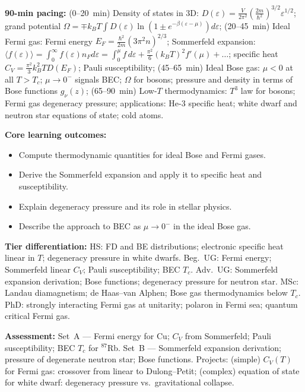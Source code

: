 \documentclass[11pt,a4paper]{article}
\begin{document}
\medskip

\begin{tcolorbox}[modulebox, title={Module~II.7 / L03: Quantum Ideal Gases}]
\textbf{90-min pacing:} (0--20~min) Density of states in 3D: $D(\varepsilon)=\tfrac{V}{2\pi^2}(\tfrac{2m}{\hbar^2})^{3/2}\varepsilon^{1/2}$; grand potential $\Omega=\mp k_BT\int D(\varepsilon)\ln(1\pm e^{-\beta(\varepsilon-\mu)})d\varepsilon$; (20--45~min) Ideal Fermi gas: Fermi energy $E_F=\tfrac{\hbar^2}{2m}(3\pi^2n)^{2/3}$; Sommerfeld expansion: $\langle f(\varepsilon)\rangle=\int_0^\infty f(\varepsilon)n_F d\varepsilon=\int_0^\mu f\,d\varepsilon+\tfrac{\pi^2}{6}(k_BT)^2f'(\mu)+\ldots$; specific heat $C_V=\tfrac{\pi^2}{3}k_B^2TD(E_F)$; Pauli susceptibility; (45--65~min) Ideal Bose gas: $\mu<0$ at all $T>T_c$; $\mu\to 0^-$ signals BEC; $\Omega$ for bosons; pressure and density in terms of Bose functions $g_\nu(z)$; (65--90~min) Low-$T$ thermodynamics: $T^3$ law for bosons; Fermi gas degeneracy pressure; applications: He-3 specific heat; white dwarf and neutron star equations of state; cold atoms.

\medskip\textbf{Core learning outcomes:}
\begin{itemize}[leftmargin=1.4em,topsep=2pt,itemsep=1pt]
  \item Compute thermodynamic quantities for ideal Bose and Fermi gases.
  \item Derive the Sommerfeld expansion and apply it to specific heat and susceptibility.
  \item Explain degeneracy pressure and its role in stellar physics.
  \item Describe the approach to BEC as $\mu\to 0^-$ in the ideal Bose gas.
\end{itemize}

\medskip\textbf{Tier differentiation:}
HS: FD and BE distributions; electronic specific heat linear in $T$; degeneracy pressure in white dwarfs.
Beg.\ UG: Fermi energy; Sommerfeld linear $C_V$; Pauli susceptibility; BEC $T_c$.
Adv.\ UG: Sommerfeld expansion derivation; Bose functions; degeneracy pressure for neutron star.
MSc: Landau diamagnetism; de Haas--van Alphen; Bose gas thermodynamics below $T_c$.
PhD: strongly interacting Fermi gas at unitarity; polaron in Fermi sea; quantum critical Fermi gas.

\medskip\textbf{Assessment:}
Set~A --- Fermi energy for Cu; $C_V$ from Sommerfeld; Pauli susceptibility; BEC $T_c$ for $^{87}$Rb.
Set~B --- Sommerfeld expansion derivation; pressure of degenerate neutron star; Bose functions.
Projects: (simple) $C_V(T)$ for Fermi gas: crossover from linear to Dulong--Petit;
(complex) equation of state for white dwarf: degeneracy pressure vs.\ gravitational collapse.
\end{tcolorbox}
\end{document}
